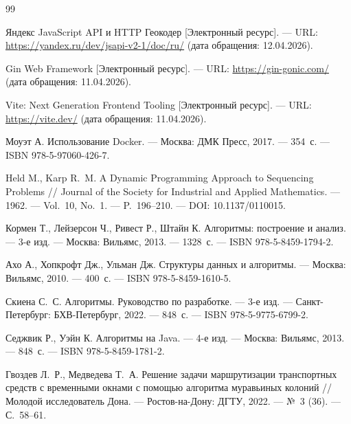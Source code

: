 \begin{thebibliography}{99}
      

      Яндекс JavaScript API и HTTP Геокодер [Электронный ресурс]. ---
      URL: \url{https://yandex.ru/dev/jsapi-v2-1/doc/ru/} (дата обращения: 12.04.2026).

      

      Gin Web Framework [Электронный ресурс]. ---
      URL: \url{https://gin-gonic.com/} (дата обращения: 11.04.2026).

      

      Vite: Next Generation Frontend Tooling [Электронный ресурс]. ---
      URL: \url{https://vite.dev/} (дата обращения: 11.04.2026).

      

      Моуэт А.
      Использование Docker. ---
      Москва: ДМК Пресс, 2017. --- 354~с. ---
      ISBN 978-5-97060-426-7.

      

      Held M., Karp R.~M.
      A Dynamic Programming Approach to Sequencing Problems //
      Journal of the Society for Industrial and Applied Mathematics. ---
      1962. --- Vol.~10, No.~1. --- P.~196--210. ---
      DOI: 10.1137/0110015.

      

      Кормен Т., Лейзерсон Ч., Ривест Р., Штайн К.
      Алгоритмы: построение и анализ. ---
      3-е изд. ---
      Москва: Вильямс, 2013. --- 1328~с. ---
      ISBN 978-5-8459-1794-2.

      

      Ахо А., Хопкрофт Дж., Ульман Дж.
      Структуры данных и алгоритмы. ---
      Москва: Вильямс, 2010. --- 400~с. ---
      ISBN 978-5-8459-1610-5.

      

      Скиена С.~С.
      Алгоритмы. Руководство по разработке. ---
      3-е изд. ---
      Санкт-Петербург: БХВ-Петербург, 2022. --- 848~с. ---
      ISBN 978-5-9775-6799-2.

      Седжвик Р., Уэйн К.
      Алгоритмы на Java. ---
      4-е изд. ---
      Москва: Вильямс, 2013. --- 848~с. ---
      ISBN 978-5-8459-1781-2.

      

      Гвоздев Л.~Р., Медведева Т.~А.
      Решение задачи маршрутизации транспортных средств с временными окнами
      с помощью алгоритма муравьиных колоний //
      Молодой исследователь Дона. --- Ростов-на-Дону: ДГТУ, 2022. ---
      №~3 (36). --- С.~58--61.


\end{thebibliography}
